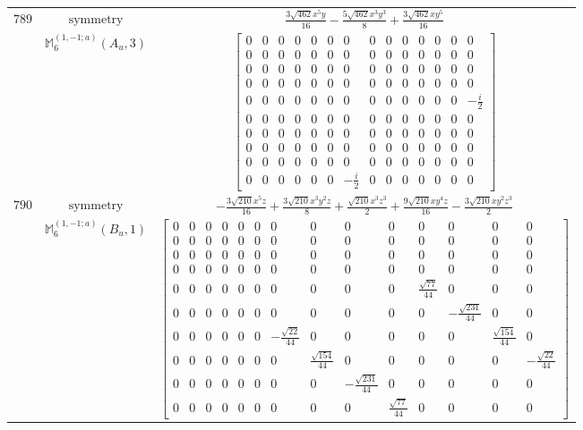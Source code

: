 \documentclass[fleqn,8pt,landscape]{jsarticle}
\begin{document}
\begin{longtable}{ccc}
$ 789 $ & $ \text{symmetry} $ & $ \frac{3 \sqrt{462} x^{5} y}{16} - \frac{5 \sqrt{462} x^{3} y^{3}}{8} + \frac{3 \sqrt{462} x y^{5}}{16} $ \\
$  $ & $ \mathbb{M}_{6}^{(1,-1;a)}(A_{u},3) $ & $ \begin{bmatrix} 0 & 0 & 0 & 0 & 0 & 0 & 0 & 0 & 0 & 0 & 0 & 0 & 0 & 0 \\ 0 & 0 & 0 & 0 & 0 & 0 & 0 & 0 & 0 & 0 & 0 & 0 & 0 & 0 \\ 0 & 0 & 0 & 0 & 0 & 0 & 0 & 0 & 0 & 0 & 0 & 0 & 0 & 0 \\ 0 & 0 & 0 & 0 & 0 & 0 & 0 & 0 & 0 & 0 & 0 & 0 & 0 & 0 \\ 0 & 0 & 0 & 0 & 0 & 0 & 0 & 0 & 0 & 0 & 0 & 0 & 0 & - \frac{i}{2} \\ 0 & 0 & 0 & 0 & 0 & 0 & 0 & 0 & 0 & 0 & 0 & 0 & 0 & 0 \\ 0 & 0 & 0 & 0 & 0 & 0 & 0 & 0 & 0 & 0 & 0 & 0 & 0 & 0 \\ 0 & 0 & 0 & 0 & 0 & 0 & 0 & 0 & 0 & 0 & 0 & 0 & 0 & 0 \\ 0 & 0 & 0 & 0 & 0 & 0 & 0 & 0 & 0 & 0 & 0 & 0 & 0 & 0 \\ 0 & 0 & 0 & 0 & 0 & 0 & - \frac{i}{2} & 0 & 0 & 0 & 0 & 0 & 0 & 0 \end{bmatrix} $ \\ \hline
$ 790 $ & $ \text{symmetry} $ & $ - \frac{3 \sqrt{210} x^{5} z}{16} + \frac{3 \sqrt{210} x^{3} y^{2} z}{8} + \frac{\sqrt{210} x^{3} z^{3}}{2} + \frac{9 \sqrt{210} x y^{4} z}{16} - \frac{3 \sqrt{210} x y^{2} z^{3}}{2} $ \\
$  $ & $ \mathbb{M}_{6}^{(1,-1;a)}(B_{u},1) $ & $ \begin{bmatrix} 0 & 0 & 0 & 0 & 0 & 0 & 0 & 0 & 0 & 0 & 0 & 0 & 0 & 0 \\ 0 & 0 & 0 & 0 & 0 & 0 & 0 & 0 & 0 & 0 & 0 & 0 & 0 & 0 \\ 0 & 0 & 0 & 0 & 0 & 0 & 0 & 0 & 0 & 0 & 0 & 0 & 0 & 0 \\ 0 & 0 & 0 & 0 & 0 & 0 & 0 & 0 & 0 & 0 & 0 & 0 & 0 & 0 \\ 0 & 0 & 0 & 0 & 0 & 0 & 0 & 0 & 0 & 0 & \frac{\sqrt{77}}{44} & 0 & 0 & 0 \\ 0 & 0 & 0 & 0 & 0 & 0 & 0 & 0 & 0 & 0 & 0 & - \frac{\sqrt{231}}{44} & 0 & 0 \\ 0 & 0 & 0 & 0 & 0 & 0 & - \frac{\sqrt{22}}{44} & 0 & 0 & 0 & 0 & 0 & \frac{\sqrt{154}}{44} & 0 \\ 0 & 0 & 0 & 0 & 0 & 0 & 0 & \frac{\sqrt{154}}{44} & 0 & 0 & 0 & 0 & 0 & - \frac{\sqrt{22}}{44} \\ 0 & 0 & 0 & 0 & 0 & 0 & 0 & 0 & - \frac{\sqrt{231}}{44} & 0 & 0 & 0 & 0 & 0 \\ 0 & 0 & 0 & 0 & 0 & 0 & 0 & 0 & 0 & \frac{\sqrt{77}}{44} & 0 & 0 & 0 & 0 \end{bmatrix} $ \\ \hline

\end{longtable}
\end{document}
